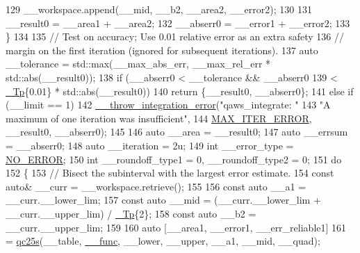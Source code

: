 \begin{DoxyCode}
129         \_\_workspace.append(\_\_mid, \_\_b2, \_\_area2, \_\_error2);
130 
131         \_\_result0 = \_\_area1 + \_\_area2;
132         \_\_abserr0 = \_\_error1 + \_\_error2;
133       \}
134 
135       \textcolor{comment}{// Test on accuracy; Use 0.01 relative error as an extra safety}
136       \textcolor{comment}{// margin on the first iteration (ignored for subsequent iterations).}
137       \textcolor{keyword}{auto} \_\_tolerance = std::max(\_\_max\_abs\_err, \_\_max\_rel\_err * std::abs(\_\_result0));
138       \textcolor{keywordflow}{if} (\_\_abserr0 < \_\_tolerance && \_\_abserr0
139           < \hyperlink{namespace____gnu__cxx_a3b19a9c800ca194374ef9172290f7d79}{\_Tp}\{0.01\} * std::abs(\_\_result0))
140         \textcolor{keywordflow}{return} \{\_\_result0, \_\_abserr0\};
141       \textcolor{keywordflow}{else} \textcolor{keywordflow}{if} (\_\_limit == 1)
142         \hyperlink{namespace____gnu__cxx_a2ae22137ca092b8ae10f4d42b4e32cfb}{\_\_throw\_integration\_error}(\textcolor{stringliteral}{"qaws\_integrate: "}
143                                   \textcolor{stringliteral}{"A maximum of one iteration was insufficient"},
144                                   \hyperlink{namespace____gnu__cxx_ad6c62dd86a596716cece6ac2d4cfd4b3a420d46d10205dd953d0ccce5323afc4c}{MAX\_ITER\_ERROR}, \_\_result0, \_\_abserr0);
145 
146       \textcolor{keyword}{auto} \_\_area = \_\_result0;
147       \textcolor{keyword}{auto} \_\_errsum = \_\_abserr0;
148       \textcolor{keyword}{auto} \_\_iteration = 2u;
149       \textcolor{keywordtype}{int} \_\_error\_type = \hyperlink{namespace____gnu__cxx_ad6c62dd86a596716cece6ac2d4cfd4b3ac31eecc280b10dec2efb4a2216ccc2e0}{NO\_ERROR};
150       \textcolor{keywordtype}{int} \_\_roundoff\_type1 = 0, \_\_roundoff\_type2 = 0;
151       \textcolor{keywordflow}{do}
152         \{
153           \textcolor{comment}{// Bisect the subinterval with the largest error estimate.}
154           \textcolor{keyword}{const} \textcolor{keyword}{auto}& \_\_curr = \_\_workspace.retrieve();
155 
156           \textcolor{keyword}{const} \textcolor{keyword}{auto} \_\_a1 = \_\_curr.\_\_lower\_lim;
157           \textcolor{keyword}{const} \textcolor{keyword}{auto} \_\_mid = (\_\_curr.\_\_lower\_lim + \_\_curr.\_\_upper\_lim) / \hyperlink{namespace____gnu__cxx_a3b19a9c800ca194374ef9172290f7d79}{\_Tp}\{2\};
158           \textcolor{keyword}{const} \textcolor{keyword}{auto} \_\_b2 = \_\_curr.\_\_upper\_lim;
159 
160           \textcolor{keyword}{auto} [\_\_area1, \_\_error1, \_\_err\_reliable1]
161             = \hyperlink{namespace____gnu__cxx_a5659189e193b420e201b6769d65289b9}{qc25s}(\_\_table, \hyperlink{namespace____gnu__cxx_af2b2f0c7a2ae72b922b1afefae5a65b2}{\_\_func}, \_\_lower, \_\_upper, \_\_a1, \_\_mid, \_\_quad);

\end{DoxyCode}
